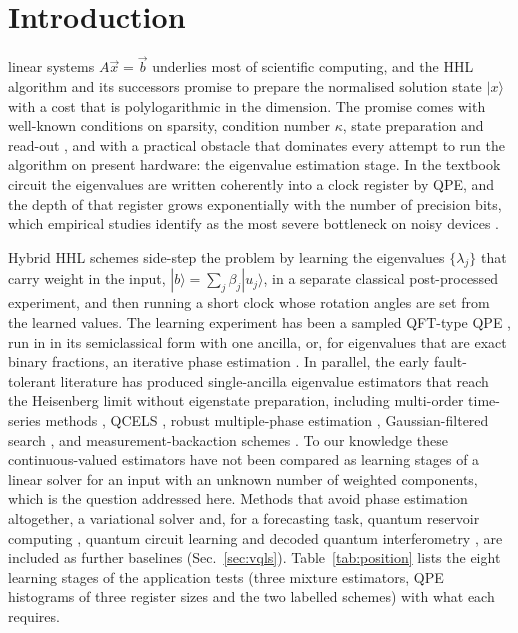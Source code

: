 \documentclass[journal]{IEEEtran}
\begin{document}
\section{Introduction}
\label{sec:introduction}
 linear systems $A\vec x=\vec b$ underlies most of scientific computing, and the HHL algorithm \cite{HHL2009} and its successors \cite{Gilyen2019,Martyn2021,Morales2026} promise to prepare the normalised solution state $|x\rangle$ with a cost that is polylogarithmic in the dimension. The promise comes with well-known conditions on sparsity, condition number $\kappa$, state preparation and read-out \cite{Morales2026,Pareek2026}, and with a practical obstacle that dominates every attempt to run the algorithm on present hardware: the eigenvalue estimation stage. In the textbook circuit the eigenvalues are written coherently into a clock register by QPE, and the depth of that register grows exponentially with the number of precision bits, which empirical studies identify as the most severe bottleneck on noisy devices \cite{Marfany2024}.

Hybrid HHL schemes \cite{Lee2019,Yalovetzky2024,Morgan2025,Gao2021} side-step the problem by learning the eigenvalues $\{\lambda_j\}$ that carry weight in the input, $|b\rangle=\sum_j\beta_j|u_j\rangle$, in a separate classical post-processed experiment, and then running a short clock whose rotation angles are set from the learned values. The learning experiment has been a sampled QFT-type QPE \cite{Lee2019,Yalovetzky2024,Morgan2025}, run in \cite{Yalovetzky2024} in its semiclassical form with one ancilla, or, for eigenvalues that are exact binary fractions, an iterative phase estimation \cite{Gao2021}. In parallel, the early fault-tolerant literature has produced single-ancilla eigenvalue estimators that reach the Heisenberg limit without eigenstate preparation, including multi-order time-series methods \cite{Dutkiewicz2022,OBrien2019}, QCELS \cite{QCELS2023,DingLin2023}, robust multiple-phase estimation \cite{RMPE2023}, Gaussian-filtered search \cite{QMEGS2024}, and measurement-backaction schemes \cite{Jin2023}. To our knowledge these continuous-valued estimators have not been compared as learning stages of a linear solver for an input with an unknown number of weighted components, which is the question addressed here. Methods that avoid phase estimation altogether, a variational solver \cite{BravoPrieto2023} and, for a forecasting task, quantum reservoir computing \cite{Fujii2017}, quantum circuit learning \cite{Mitarai2018} and decoded quantum interferometry \cite{Jordan2025}, are included as further baselines (Sec.~\ref{sec:vqls}). Table~\ref{tab:position} lists the eight learning stages of the application tests (three mixture estimators, QPE histograms of three register sizes and the two labelled schemes) with what each requires.
\end{document}
